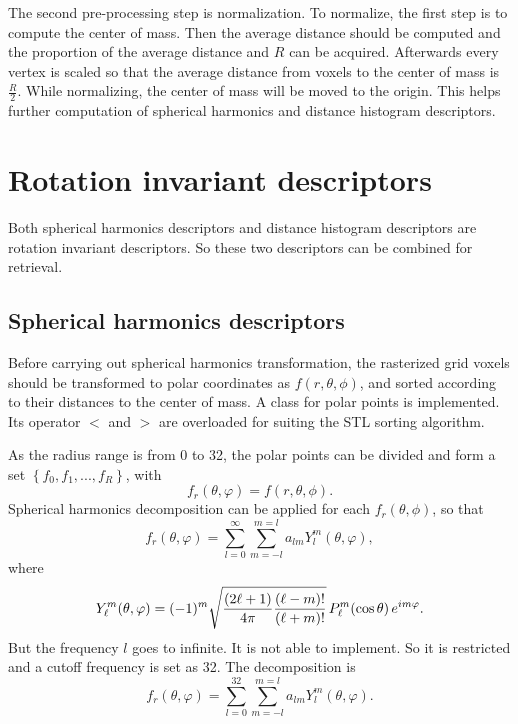 The second pre-processing step is normalization. To normalize, the first step is to compute the center of mass. Then the average distance should be computed and the proportion of the average distance and $R$ can be acquired. Afterwards every vertex is scaled so that the average distance from voxels to the center of mass is $ \frac{R}{2}$. While normalizing, the center of mass will be moved to the origin. This helps further computation of spherical harmonics and distance histogram descriptors.

\section{Rotation invariant descriptors}

Both spherical harmonics descriptors and distance histogram descriptors are rotation invariant descriptors. So these two descriptors can be combined for retrieval. 

\subsection{Spherical harmonics descriptors}

Before carrying out spherical harmonics transformation, the rasterized grid voxels should be transformed to polar coordinates as $f(r,\theta,\phi)$, and sorted according to their distances to the center of mass. A class for polar points is implemented. Its operator $<$ and $>$ are overloaded for suiting the STL sorting algorithm. 

As the radius range is from 0 to 32, the polar points can be divided and form a set ${\left\{ f_0,f_1,...,f_R \right\}}$, with 
\begin{equation}
f_r(\theta,\varphi)=f(r,\theta,\phi).
\end{equation}
Spherical harmonics decomposition can be applied for each $f_r(\theta,\phi)$, so that
\begin{equation}
f_r(\theta,\varphi)=\sum_{l=0}^{\infty}\sum_{m=-l}^{m=l}a_{lm}Y_{l}^{m}(\theta,\varphi),
\end{equation}
where
\begin{equation}
Y_\ell^m( \theta , \varphi ) = (-1)^m \sqrt{{(2\ell+1)\over 4\pi}{(\ell-m)!\over (\ell+m)!}} \, P_\ell^m ( \cos{\theta} ) \, e^{i m \varphi }.
\end{equation}
But the frequency $l$ goes to infinite. It is not able to implement. So it is restricted and a cutoff frequency is set as 32. The decomposition is 
\begin{equation}
f_r(\theta,\varphi)=\sum_{l=0}^{32}\sum_{m=-l}^{m=l}a_{lm}Y_{l}^{m}(\theta,\varphi).
\end{equation}

